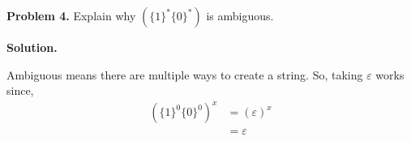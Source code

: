 \textbf{Problem 4.} Explain why $ \left( \{1\}^* \{0\}^* \right) $
is ambiguous.

\textbf{Solution.}

Ambiguous means there are multiple ways to create a string. So, taking
$ \varepsilon $ works since,
\begin{align*}
    \left(\{1\}^0\{0\}^0\right)^{x}
     & =(\varepsilon)^{x} \\
     & =\varepsilon
\end{align*}
